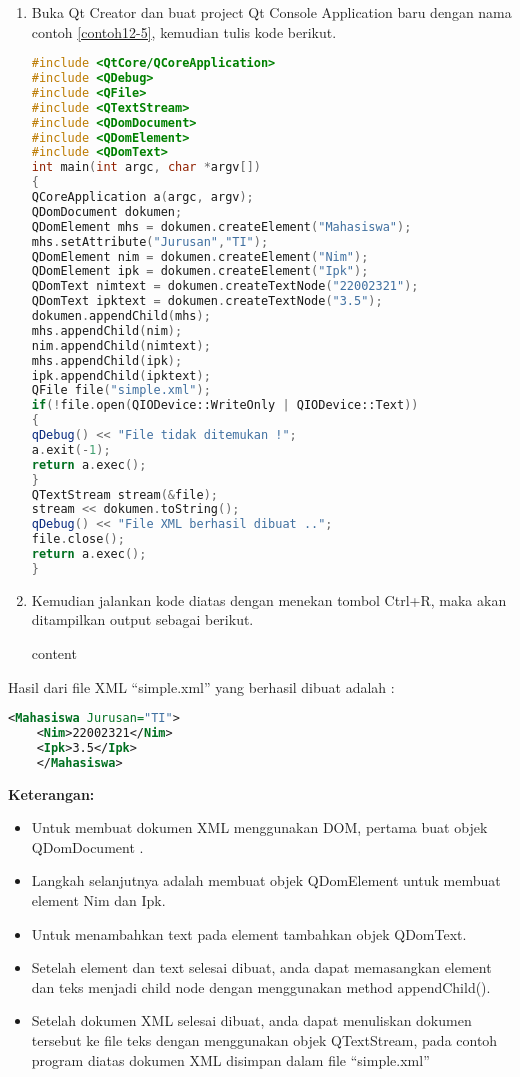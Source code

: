 \begin{enumerate}

\item
  Buka Qt Creator dan buat project Qt Console Application baru dengan
  nama contoh \ref{contoh12-5}, kemudian tulis kode berikut.

\begin{lstlisting}[language=c++, caption=Membuat Nodes untuk membuat simple XML Document, label=contoh12-5]
#include <QtCore/QCoreApplication>
#include <QDebug>
#include <QFile>
#include <QTextStream>
#include <QDomDocument>
#include <QDomElement>
#include <QDomText>
int main(int argc, char *argv[])
{
QCoreApplication a(argc, argv);
QDomDocument dokumen;
QDomElement mhs = dokumen.createElement("Mahasiswa");
mhs.setAttribute("Jurusan","TI");
QDomElement nim = dokumen.createElement("Nim");
QDomElement ipk = dokumen.createElement("Ipk");
QDomText nimtext = dokumen.createTextNode("22002321");
QDomText ipktext = dokumen.createTextNode("3.5");
dokumen.appendChild(mhs);
mhs.appendChild(nim);
nim.appendChild(nimtext);
mhs.appendChild(ipk);
ipk.appendChild(ipktext);
QFile file("simple.xml");
if(!file.open(QIODevice::WriteOnly | QIODevice::Text))
{
qDebug() << "File tidak ditemukan !";
a.exit(-1);
return a.exec();
}
QTextStream stream(&file);
stream << dokumen.toString();
qDebug() << "File XML berhasil dibuat ..";
file.close();
return a.exec();
}
\end{lstlisting}
\item
  Kemudian jalankan kode diatas dengan menekan tombol Ctrl+R, maka akan
  ditampilkan output sebagai berikut.
  
  \begin{lcverbatim}
  	content
  \end{lcverbatim}
\end{enumerate}

Hasil dari file XML ``simple.xml'' yang berhasil dibuat adalah :

 \begin{lstlisting}[language=xml]
 	<Mahasiswa Jurusan="TI">
 	<Nim>22002321</Nim>
 	<Ipk>3.5</Ipk>
 	</Mahasiswa>
 \end{lstlisting}

\textbf{Keterangan:}

\begin{itemize}

\item
  Untuk membuat dokumen XML menggunakan DOM, pertama buat objek
  QDomDocument .
\item
  Langkah selanjutnya adalah membuat objek QDomElement untuk membuat
  element Nim dan Ipk.
\item
  Untuk menambahkan text pada element tambahkan objek QDomText.
\item
  Setelah element dan text selesai dibuat, anda dapat memasangkan
  element dan teks menjadi child node dengan menggunakan method
  appendChild().
\item
  Setelah dokumen XML selesai dibuat, anda dapat menuliskan dokumen
  tersebut ke file teks dengan menggunakan objek QTextStream, pada
  contoh program diatas dokumen XML disimpan dalam file ``simple.xml''
\end{itemize}

